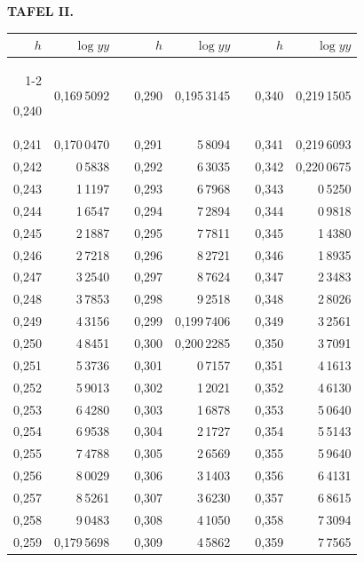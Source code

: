 \endgroup
\clearpage
{}
\begingroup
\centering
\fontsize{9}{9}\selectfont
\setlength{\tabcolsep}{8pt}
\renewcommand{\arraystretch}{1}
\setlength{\parskip}{0pt}
\textbf{TAFEL II.}
\par\vspace{7pt}
\begin{tabular}{|r|r|@{}p{9pt}@{}|r|r|@{}p{9pt}@{}|r|r|}
\hline
\rule{0pt}{8.5pt}\(h\) & \(\log yy\) & & \(h\) & \(\log yy\) & & \(h\) & \(\log yy\) \\
\cline{1-2}\cline{4-5}\cline{7-8}
\rule{0pt}{8.5pt}0,240 & 0,169\,5092 &  & 0,290 & 0,195\,3145 &  & 0,340 & 0,219\,1505 \\
0,241 & 0,170\,0470 &  & 0,291 & 5\,8094 &  & 0,341 & 0,219\,6093 \\
0,242 & 0\,5838 &  & 0,292 & 6\,3035 &  & 0,342 & 0,220\,0675 \\
0,243 & 1\,1197 &  & 0,293 & 6\,7968 &  & 0,343 & 0\,5250 \\
0,244 & 1\,6547 &  & 0,294 & 7\,2894 &  & 0,344 & 0\,9818 \\
0,245 & 2\,1887 &  & 0,295 & 7\,7811 &  & 0,345 & 1\,4380 \\[3pt]
0,246 & 2\,7218 &  & 0,296 & 8\,2721 &  & 0,346 & 1\,8935 \\
0,247 & 3\,2540 &  & 0,297 & 8\,7624 &  & 0,347 & 2\,3483 \\
0,248 & 3\,7853 &  & 0,298 & 9\,2518 &  & 0,348 & 2\,8026 \\
0,249 & 4\,3156 &  & 0,299 & 0,199\,7406 &  & 0,349 & 3\,2561 \\
0,250 & 4\,8451 &  & 0,300 & 0,200\,2285 &  & 0,350 & 3\,7091 \\[3pt]
0,251 & 5\,3736 &  & 0,301 & 0\,7157 &  & 0,351 & 4\,1613 \\
0,252 & 5\,9013 &  & 0,302 & 1\,2021 &  & 0,352 & 4\,6130 \\
0,253 & 6\,4280 &  & 0,303 & 1\,6878 &  & 0,353 & 5\,0640 \\
0,254 & 6\,9538 &  & 0,304 & 2\,1727 &  & 0,354 & 5\,5143 \\
0,255 & 7\,4788 &  & 0,305 & 2\,6569 &  & 0,355 & 5\,9640 \\[3pt]
0,256 & 8\,0029 &  & 0,306 & 3\,1403 &  & 0,356 & 6\,4131 \\
0,257 & 8\,5261 &  & 0,307 & 3\,6230 &  & 0,357 & 6\,8615 \\
0,258 & 9\,0483 &  & 0,308 & 4\,1050 &  & 0,358 & 7\,3094 \\
0,259 & 0,179\,5698 &  & 0,309 & 4\,5862 &  & 0,359 & 7\,7565 \\

\end{tabular}
